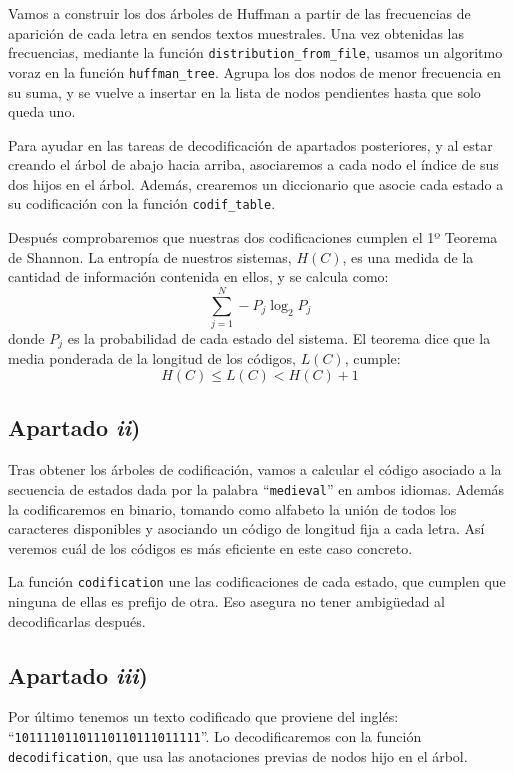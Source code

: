 \documentclass[a4paper]{article}
\begin{document}
	Vamos a construir los dos árboles de Huffman a partir de las frecuencias de aparición de cada letra en sendos textos muestrales. Una vez obtenidas las frecuencias, mediante la función \verb+distribution_from_file+, usamos un algoritmo voraz en la función \verb+huffman_tree+. Agrupa los dos nodos de menor frecuencia en su suma, y se vuelve a insertar en la lista de nodos pendientes hasta que solo queda uno.
	
	Para ayudar en las tareas de decodificación de apartados posteriores, y al estar creando el árbol de abajo hacia arriba, asociaremos a cada nodo el índice de sus dos hijos en el árbol. Además, crearemos un diccionario que asocie cada estado a su codificación con la función \verb+codif_table+.
	
	Después comprobaremos que nuestras dos codificaciones cumplen el 1º Teorema de Shannon. La entropía de nuestros sistemas, $H(C)$, es una medida de la cantidad de información contenida en ellos, y se calcula como: $$\sum\limits_{j=1}^N -P_j\log_2 P_j$$ donde $P_j$ es la probabilidad de cada estado del sistema. El teorema dice que
	la media ponderada de la longitud de los códigos, $L(C)$, cumple: $$H(C) \leq L(C) < H(C)+1$$
	
	
	\subsection{Apartado \textit{ii})}
	Tras obtener los árboles de codificación, vamos a calcular el código asociado a la secuencia de estados dada por la palabra ``\verb+medieval+'' en ambos idiomas. Además la codificaremos en binario, tomando como alfabeto la unión de todos los caracteres disponibles y asociando un código de longitud fija a cada letra. Así veremos cuál de los códigos es más eficiente en este caso concreto.
	
	La función \verb|codification| une las codificaciones de cada estado, que cumplen que ninguna de ellas es prefijo de otra. Eso asegura no tener ambigüedad al decodificarlas después. 
	
	\subsection{Apartado \textit{iii})}
	
	Por último tenemos un texto codificado que proviene del inglés: ``\verb+10111101101110110111011111+''. Lo decodificaremos con la función \verb|decodification|, que usa las anotaciones previas de nodos hijo en el árbol.
	
\end{document}
